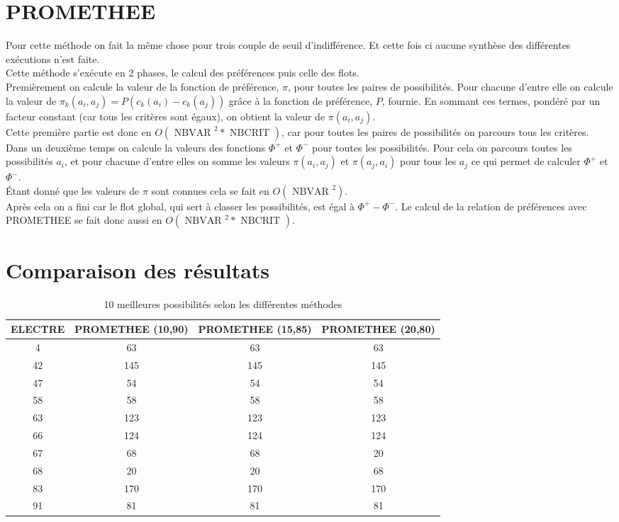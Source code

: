 \documentclass[12pt,a4paper]{article}
\begin{document}
\section{PROMETHEE}

Pour cette méthode on fait la même chose pour trois couple de seuil d’indifférence. Et cette fois ci aucune synthèse des différentes exécutions n'est faite.\\

Cette méthode s’exécute en 2 phases, le calcul des préférences puis celle des flots.\\
Premièrement on calcule la valeur de la fonction de préférence, $\pi$, pour toutes les paires de possibilités. Pour chacune d'entre elle on calcule la valeur de $ \pi_k(a_i, a_j)  = P( c_k(a_i) - c_k(a_j) )$ grâce à la fonction de préférence, $P$, fournie. En sommant ces termes, pondéré par un facteur constant (car tous les critères sont égaux), on obtient la valeur de $\pi(a_i, a_j)$.\\
Cette première partie est donc en $O( \text{ NBVAR }^2 * \text{ NBCRIT } )$, car pour toutes les paires de possibilités on parcours tous les critères.\\
Dans un deuxième temps on calcule la valeurs des fonctions $\Phi^+$ et $\Phi^-$ pour toutes les possibilités. Pour cela on parcours toutes les possibilités $a_i$, et pour chacune d'entre elles on somme les valeurs $\pi(a_i, a_j)$ et $\pi(a_j,a_i)$ pour tous les $a_j$ ce qui permet de calculer $\Phi^+$ et $\Phi^-$.\\
Étant donné que les valeurs de $\pi$ sont connues cela se fait en $O( \text{ NBVAR }^2)$.\\
Après cela on a fini car le flot global, qui sert à classer les possibilités, est égal à $\Phi^+ - \Phi^-$. Le calcul de la relation de préférences avec PROMETHEE se fait donc aussi en $O( \text{ NBVAR }^2 * \text{ NBCRIT } )$.\\

\newpage
\section{Comparaison des résultats}

\begin{table}[!h]
\centering
\begin{tabular}{|*{4}{c|}}
  \hline
  ELECTRE & PROMETHEE (10,90) & PROMETHEE (15,85) & PROMETHEE (20,80) \\
  \hline
	4 & 63 & 63 & 63 \\
	42 & 145 & 145 & 145 \\
	47 & 54 & 54 & 54 \\
	58 & 58 & 58 & 58 \\
	63 & 123 & 123 & 123 \\
	66 & 124 & 124 & 124 \\
	67 & 68 & 68 & 20 \\
	68 & 20 & 20 & 68 \\
	83 & 170 & 170 & 170 \\
	91 & 81 & 81 & 81 \\
  \hline
\end{tabular}
\caption{10 meilleures possibilités selon les différentes méthodes}
\label{10best}
\end{table}
\end{document}
